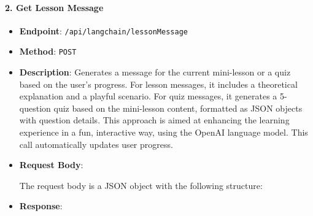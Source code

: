 \hypertarget{get-lesson-message}{%
\paragraph{2. Get Lesson Message}\label{get-lesson-message}}

\begin{itemize}
\item
  \textbf{Endpoint}: \texttt{/api/langchain/lessonMessage}
\item
  \textbf{Method}: \texttt{POST}
\item
  \textbf{Description}: Generates a message for the current mini-lesson
  or a quiz based on the user's progress. For lesson messages, it
  includes a theoretical explanation and a playful scenario. For quiz
  messages, it generates a 5-question quiz based on the mini-lesson
  content, formatted as JSON objects with question details. This
  approach is aimed at enhancing the learning experience in a fun,
  interactive way, using the OpenAI language model. This call
  automatically updates user progress.
\item
  \textbf{Request Body}:

  The request body is a JSON object with the following structure:

\begin{Shaded}
\begin{Highlighting}[]
\FunctionTok{\{}
  \FunctionTok{:} \FunctionTok{,}
  \FunctionTok{:} \FunctionTok{,}
  \FunctionTok{:} \FunctionTok{,}
  \FunctionTok{:} \FunctionTok{\{}
    \FunctionTok{:} \FunctionTok{,}
    \FunctionTok{:} \FunctionTok{,}
    \FunctionTok{:} \FunctionTok{,}
    \FunctionTok{:} \FunctionTok{,}
    \FunctionTok{:} 
  \FunctionTok{\},}
  \FunctionTok{:} \FunctionTok{\{}
    \FunctionTok{:} \FunctionTok{,}
    \FunctionTok{:} \FunctionTok{,}
    \FunctionTok{:} 
  \FunctionTok{\}}
\FunctionTok{\}}
\end{Highlighting}
\end{Shaded}
\item
  \textbf{Response}:


\end{itemize}
